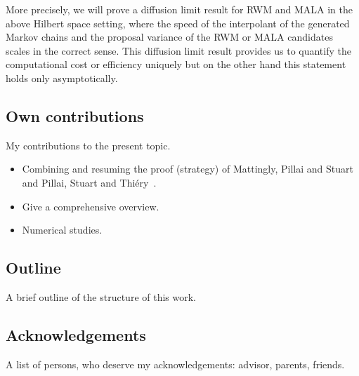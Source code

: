 More precisely, we will prove a diffusion limit result for RWM and MALA in the above Hilbert space setting, where the speed of the interpolant of the generated Markov chains and the proposal variance of the RWM or MALA candidates scales in the correct sense. This diffusion limit result provides us to quantify the computational cost or efficiency uniquely but on the other hand this statement holds only asymptotically.




\subsection*{Own contributions}

My contributions to the present topic.
\begin{itemize}
 \item Combining and resuming the proof (strategy) of Mattingly, Pillai and Stuart~\autocite{Mattingly2010} and Pillai, Stuart and Thi\'{e}ry~\autocite{Pillai2012}.
 \item Give a comprehensive overview.
 \item Numerical studies.
\end{itemize}


\subsection*{Outline}

A brief outline of the structure of this work.


\subsection*{Acknowledgements}

A list of persons, who deserve my acknowledgements: advisor, parents, friends.



